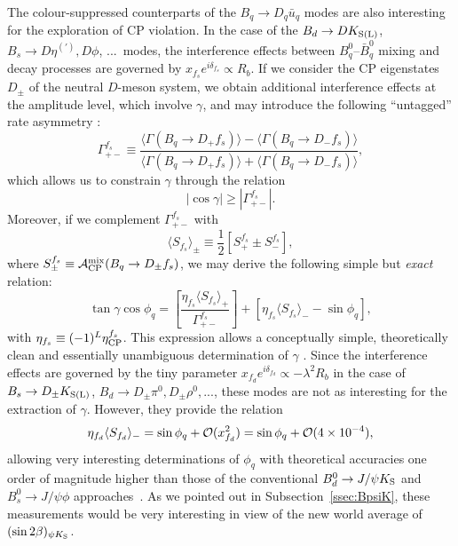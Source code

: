 \documentclass[12pt]{article}
\begin{document}
The colour-suppressed counterparts
of the $B_q\to D_q \bar u_q$ modes are also interesting
for the exploration of CP violation. 
In the case of the $B_d\to D K_{\rm S(L)}$, $B_s\to D \eta^{(')}, D \phi$, ...\
modes, the interference effects between $B^0_q$--$\bar B^0_q$ mixing
and decay processes are governed by $x_{f_s}e^{i\delta_{f_s}}\propto R_b$.
If we consider the CP eigenstates $D_\pm$ of the neutral $D$-meson system, 
we obtain additional interference effects at the amplitude level, which involve 
$\gamma$, and may introduce the following ``untagged'' rate asymmetry 
\cite{RF-BdDpi0}:
\begin{equation}
\Gamma_{+-}^{f_s}\equiv
\frac{\langle\Gamma(B_q\to D_+ f_s)\rangle-\langle
\Gamma(B_q\to D_- f_s)\rangle}{\langle\Gamma(B_q\to D_+ f_s)\rangle
+\langle\Gamma(B_q\to D_- f_s)\rangle},
\end{equation}
which allows us to constrain $\gamma$ through the relation
\begin{equation}
|\cos\gamma|\geq |\Gamma_{+-}^{f_s}|. 
\end{equation}
Moreover, if we complement
$\Gamma_{+-}^{f_s}$ with 
\begin{equation}
\langle S_{f_s}\rangle_\pm\equiv \frac{1}{2}\left[S_+^{f_s}\pm S_-^{f_s}\right],
\end{equation}
where $S_\pm^{f_s}\equiv {\cal A}_{\rm CP}^{\rm mix}(B_q\to D_\pm f_s)$,
we may derive the following simple but {\it exact} relation:
\begin{equation}
\tan\gamma\cos\phi_q=
\left[\frac{\eta_{f_s} \langle S_{f_s}
\rangle_+}{\Gamma_{+-}^{f_s}}\right]+\left[\eta_{f_s}\langle S_{f_s}\rangle_--
\sin\phi_q\right],
\end{equation}
with $\eta_{f_s}\equiv(-1)^L\eta_{\rm CP}^{f_s}$. This expression allows 
a conceptually simple, theoretically clean and essentially unambiguous 
determination of $\gamma$ \cite{RF-BdDpi0}. Since the interference effects are 
governed by the tiny parameter $x_{f_d}e^{i\delta_{f_d}}\propto -\lambda^2R_b$
in the case of $B_s\to D_\pm K_{\rm S(L)}$, 
$B_d\to D_\pm \pi^0, D_\pm \rho^0, ...$, these modes are not as interesting 
for the extraction of $\gamma$. However, they provide the relation
\begin{equation}
\eta_{f_d}\langle S_{f_d}\rangle_-=\sin\phi_q + {\cal O}(x_{f_d}^2)
=\sin\phi_q + {\cal O}(4\times 10^{-4}),
\end{equation}
allowing very interesting determinations of $\phi_q$ with theoretical 
accuracies one order of magnitude higher than those of
the conventional  $B^0_d\to J/\psi K_{\rm S}$ and $B^0_s\to J/\psi \phi$
approaches~\cite{RF-BdDpi0}. As we pointed out in Subsection~\ref{ssec:BpsiK},
these measurements would be very interesting in view of the new world
average of $(\sin2\beta)_{\psi K_{\rm S}}$. 
\end{document}
